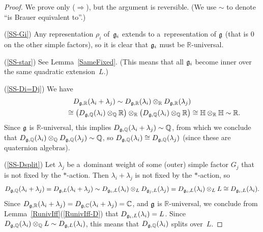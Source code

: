 \begin{proof}
We prove only ($\Rightarrow$), but the argument is reversible.
(We use $\sim$ to denote ``is Brauer equivalent to''.)

(\ref{SS-Gi}) Any representation $\rho_i$ of~$\Lie G_i$ extends to a~representation of $\Lie G$ (that is $0$ on the
other simple factors), so it is clear that $\Lie G_i$ must be $\mathbb{R}$-universal.

(\ref{SS-star}) See Lemma~\ref{SameFixed}.
(This means that all $\Lie G_i$ become inner over the same quadratic extension~$L$.)

(\ref{SS-Di=Dj}) We have
\begin{gather*}
D_{\Lie G, \mathbb{R}}(\lambda_i + \lambda_j) \sim D_{\Lie G, \mathbb{R}}(\lambda_i) \otimes_\mathbb{R} D_{\Lie G,
\mathbb{R}}(\lambda_j) \\
\hphantom{D_{\Lie G, \mathbb{R}}(\lambda_i + \lambda_j)}{}
\cong \bigl(D_{\Lie G, \mathbb{Q}}(\lambda_i) \otimes_\mathbb{Q} \mathbb{R} \bigr)
\otimes_\mathbb{R} \bigl(D_{\Lie G, \mathbb{Q}}(\lambda_i) \otimes_\mathbb{Q} \mathbb{R} \bigr) \cong \mathbb{H}
\otimes_\mathbb{R} \mathbb{H} \sim \mathbb{R}.
\end{gather*}
Since $\Lie G$ is $\mathbb{R}$-universal, this implies $D_{\Lie G, \mathbb{Q}}(\lambda_i + \lambda_j) \sim\mathbb{Q}$,
from which we conclude that $D_{\Lie G, \mathbb{Q}}(\lambda_i) \otimes_\mathbb{Q} D_{\Lie G, \mathbb{Q}}(\lambda_j) \sim
\mathbb{Q}$, so $D_{\Lie G, \mathbb{Q}}(\lambda_i) \cong D_{\Lie G, \mathbb{Q}}(\lambda_j)$ (since these are quaternion
algebras).

(\ref{SS-Dsplit}) Let $\lambda_j$ be a~dominant weight of some (outer) simple factor $G_j$ that is not f\/ixed by the
$*$-action.
Then $\lambda_i + \lambda_j$ is not f\/ixed by the $*$-action, so
\begin{gather*}
D_{\Lie G, \mathbb{Q}}(\lambda_i + \lambda_j) = D_{\Lie G, L}(\lambda_i + \lambda_j) \sim D_{\Lie G_i, L}(\lambda_i)
\otimes_L D_{\Lie G_j, L}(\lambda_j) = D_{\Lie G_i, L}(\lambda_i) \otimes_L L \cong D_{\Lie G_i, L}(\lambda_i).
\end{gather*}
Since $D_{\Lie G, \mathbb{R}}(\lambda_i + \lambda_j) = D_{\Lie G, \mathbb{C}}(\lambda_i + \lambda_j) = \mathbb{C}$, and
$\Lie G$ is $\mathbb{R}$-universal, we conclude from Lemma~\ref{RunivIff}(\ref{RunivIff-D}) that $D_{\Lie G_i, L}(\lambda_i) = L$.
Since $D_{\Lie G, \mathbb{Q}}(\lambda_i) \otimes_\mathbb{Q} L \sim D_{\Lie G, L}(\lambda_i)$, this means that $D_{\Lie
G, \mathbb{Q}}(\lambda_i)$ splits over~$L$.
\end{proof}


